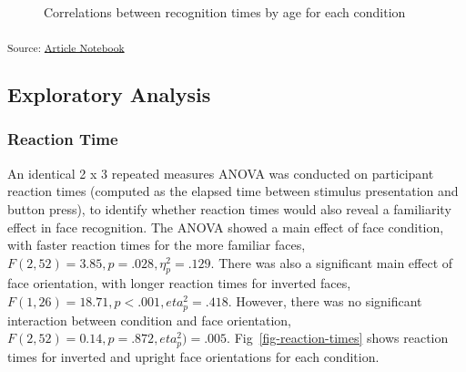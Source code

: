\documentclass[
  10pt,
  letterpaper,
]{article}
\begin{document}
\label{cell-fig-correlations}
\begin{figure}[H]


\caption{\label{fig-correlations}Correlations between recognition times
by age for each condition}

\end{figure}%

\textsubscript{Source:
\href{https://deborahapthorp.github.io/SelfFaceManuscript/index-preview.html}{Article
Notebook}}

\subsection{Exploratory Analysis}\label{exploratory-analysis}

\subsubsection{Reaction Time}\label{reaction-time}

An identical 2 x 3 repeated measures ANOVA was conducted on participant
reaction times (computed as the elapsed time between stimulus
presentation and button press), to identify whether reaction times would
also reveal a familiarity effect in face recognition. The ANOVA showed a
main effect of face condition, with faster reaction times for the more
familiar faces, \(F(2, 52) = 3.85, p = .028, \eta_p^2 = .129\). There
was also a significant main effect of face orientation, with longer
reaction times for inverted faces,
\(F(1, 26) = 18.71, p <.001, eta_p^2 = .418\). However, there was no
significant interaction between condition and face orientation,
\(F(2, 52) = 0.14, p = .872, eta_p^2) = .005\).
Fig~\ref{fig-reaction-times} shows reaction times for inverted and
upright face orientations for each condition.
\end{document}
